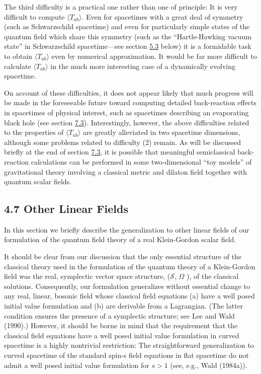 \documentclass[11pt,a4paper]{article}
\begin{document}
The third difficulty is a practical one rather than one of principle: It is very difficult to compute \(\langle T_{ab} \rangle \). Even for spacetimes with a great deal of symmetry (such as Schwarzschild spacetime) and even for particularly simple states of the quantum field which share this symmetry (such as the ``Hartle-Hawking vacuum state'' in Schwarzschild spacetime---see section \hyperlink{sec:5.3}{5.3} below) it is a formidable task to obtain \(\langle T_{ab} \rangle \) even by numerical approximation. It would be far more difficult to calculate \(\langle T_{ab} \rangle \) in the much more interesting case of a dynamically evolving spacetime.

On account of these difficulties, it does not appear likely that much progress will be made in the foreseeable future toward computing detailed back-reaction effects in spacetimes of physical interest, such as spacetimes describing an evaporating black hole (see section \hyperlink{sec:7.3}{7.3}). Interestingly, however, the above difficulties related to the properties of \(\langle T_{ab}\rangle \) are greatly alleviated in two spacetime dimensions, although some problems related to difficulty (2) remain. As will be discussed briefly at the end of section \hyperlink{sec:7.3}{7.3}, it is possible that meaningful semiclassical back-reaction calculations can be performed in some two-dimensional ``toy models'' of gravitational theory involving a classical metric and dilaton field together with quantum scalar fields.

\subsection*{4.7 Other Linear Fields}\hypertarget{sec:4.7}{}

In this section we briefly describe the generalization to other linear fields of our formulation of the quantum field theory of a real Klein-Gordon scalar field.

It should be clear from our discussion that the only essential structure of the classical theory used in the formulation of the quantum theory of a Klein-Gordon field was the real, symplectic vector space structure, (\(\mathcal{S}\), \(\Omega\) ), of the classical solutions. Consequently, our formulation generalizes without essential change to any real, linear, bosonic field whose classical field equations (a) have a well posed initial value formulation and (b) are derivable from a Lagrangian. (The latter condition ensures the presence of a symplectic structure; see Lee and Wald (1990).) However, it should be borne in mind that the requirement that the classical field equations have a well posed initial value formulation in curved spacetime is a highly nontrivial restriction: The straightforward generalization\hypertarget{source-114}{} to curved spacetime of the standard spin-s field equations in flat spacetime do not admit a well posed initial value formulation for \(s>1\) (see, e.g., Wald (1984a)).
\end{document}
